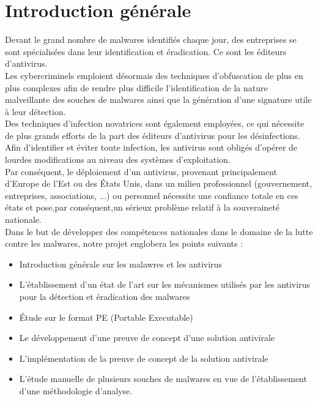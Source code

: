 \newpage
\chapter*{Introduction générale}


Devant le grand nombre de malwares identifiés chaque jour, des entreprises se sont spécialisées dans leur identification et éradication. Ce sont les éditeurs d'antivirus.\\

Les cybercriminels emploient désormais des techniques d'obfuscation de plus en plus complexes afin de rendre plus difficile l'identification de la nature malveillante des souches de malwares ainsi que la génération d'une signature utile à leur détection.\\

Des techniques d'infection novatrices sont également employées, ce qui nécessite de plus grands efforts de la part des éditeurs d'antivirus pour les désinfections. Afin d'identifier et éviter toute infection, les antivirus sont obligés d'opérer de lourdes modifications au niveau des systèmes d'exploitation.\\

Par conséquent, le déploiement d'un antivirus, provenant principalement d'Europe de l'Est ou des États Unis, dans un milieu professionnel (gouvernement, entreprises, associations, ...) ou personnel nécessite une confiance totale en ces états et pose,par conséquent,un sérieux problème relatif à la souveraineté nationale.\\

Dans le but de développer des compétences nationales dans le domaine de la lutte contre les malwares, notre projet englobera les points suivants :\\
\begin{itemize}


\item Introduction générale sur les malawres et les antivirus
\item L'établissement d'un état de l'art sur les mécanismes utilisés par les antivirus pour la détection et éradication des malwares
\item Étude sur le format PE (Portable Executable)
\item Le développement d'une preuve de concept d'une solution antivirale
\item L'implémentation de la preuve de concept de la solution antivirale
\item L'étude manuelle de plusieurs souches de malwares en vue de l'établissement d'une méthodologie d'analyse.
\end{itemize}
